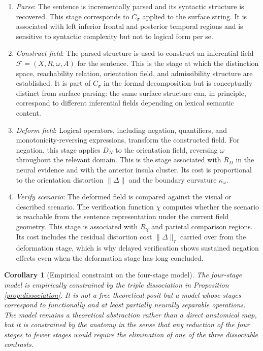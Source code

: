 \documentclass[12pt]{article}
\newtheorem{corollary}[theorem]{Corollary}
\theoremstyle{remark}
\begin{document}
\begin{enumerate}
\item \emph{Parse}: The sentence is incrementally parsed and its
syntactic structure is recovered. This stage corresponds to $C_{\sigma}$
applied to the surface string. It is associated with left inferior
frontal and posterior temporal regions and is sensitive to syntactic
complexity but not to logical form per se.

\item \emph{Construct field}: The parsed structure is used to construct
an inferential field $\mathcal{F} = (X, R, \omega, A)$ for the sentence.
This is the stage at which the distinction space, reachability relation,
orientation field, and admissibility structure are established. It is
part of $C_{\sigma}$ in the formal decomposition but is conceptually
distinct from surface parsing: the same surface structure can, in
principle, correspond to different inferential fields depending on
lexical semantic content.

\item \emph{Deform field}: Logical operators, including negation,
quantifiers, and monotonicity-reversing expressions, transform the
constructed field. For negation, this stage applies $D_N$ to the
orientation field, reversing $\omega$ throughout the relevant domain.
This is the stage associated with $R_D$ in the neural evidence and with
the anterior insula cluster. Its cost is proportional to the orientation
distortion $\|\Delta\|$ and the boundary curvature $\kappa_\omega$.

\item \emph{Verify scenario}: The deformed field is compared against the
visual or described scenario. The verification function $\chi$ computes
whether the scenario is reachable from the sentence representation under
the current field geometry. This stage is associated with $R_\chi$ and
parietal comparison regions. Its cost includes the residual distortion
cost $\|\Delta\|_\tau$ carried over from the deformation stage, which is
why delayed verification shows sustained negation effects even when the
deformation stage has long concluded.
\end{enumerate}

\begin{corollary}[Empirical constraint on the four-stage model]
\label{cor:four-stage}
The four-stage model is empirically constrained by the triple dissociation
in Proposition \ref{prop:dissociation}. It is not a free theoretical
posit but a model whose stages correspond to functionally and at least
partially neurally separable operations. The model remains a theoretical
abstraction rather than a direct anatomical map, but it is constrained
by the anatomy in the sense that any reduction of the four stages to
fewer stages would require the elimination of one of the three
dissociable contrasts.
\end{corollary}
\end{document}
